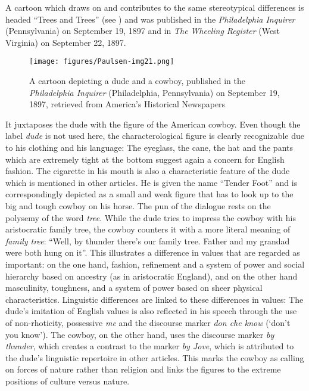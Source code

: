A cartoon which draws on and contributes to the same stereotypical differences is headed “Trees and Trees” (see ) and was published in the \emph{Philadelphia Inquirer} (Pennsylvania) on September 19, 1897 and in \emph{The} \emph{Wheeling Register} (West Virginia) on September 22, 1897.
\begin{figure}
\texttt{[image: figures/Paulsen-img21.png]}
\caption{
A cartoon depicting a dude and a cowboy, published in the \emph{Philadelphia Inquirer} (Philadelphia, Pennsylvania) on September 19, 1897, retrieved from America's Historical Newspapers
}
\label{fig:key:21}
\end{figure}
It juxtaposes the dude with the figure of the American cowboy. Even though the label \textit{dude} is not used here, the characterological figure is clearly recognizable due to his clothing and his language: The eyeglass, the cane, the hat and the pants which are extremely tight at the bottom suggest again a concern for English fashion. The cigarette in his mouth is also a characteristic feature of the dude which is mentioned in other articles. He is given the name “Tender Foot” and is correspondingly depicted as a small and weak figure that has to look up to the big and tough cowboy on his horse. The pun of the dialogue rests on the polysemy of the word \textit{tree}. While the dude tries to impress the cowboy with his aristocratic family tree, the cowboy counters it with a more literal meaning of \emph{family tree}: “Well, by thunder there’s our family tree. Father and my grandad were both hung on it”. This illustrates a difference in values that are regarded as important: on the one hand, fashion, refinement and a system of power and social hierarchy based on ancestry (as in aristocratic England), and on the other hand masculinity, toughness, and a system of power based on sheer physical characteristics. Linguistic differences are linked to these differences in values: The dude’s imitation of English values is also reflected in his speech through the use of non-rhoticity, possessive \emph{me} and the discourse marker \emph{don che know} (‘don’t you know’). The cowboy, on the other hand, uses the discourse marker \emph{by thunder}, which creates a contrast to the marker \emph{by Jove}, which is attributed to the dude’s linguistic repertoire in other articles. This marks the cowboy as calling on forces of nature rather than religion and links the figures to the extreme positions of culture versus nature.


